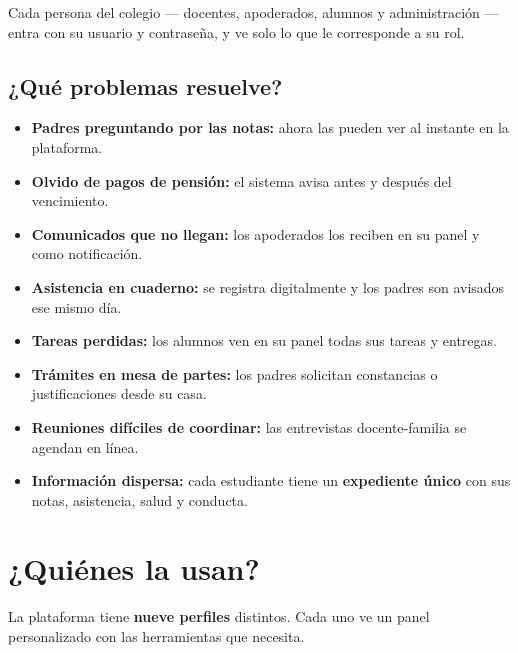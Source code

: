 \documentclass[11pt,a4paper]{article}
\begin{document}
Cada persona del colegio --- docentes, apoderados, alumnos y administración --- entra con su usuario y contraseña, y ve solo lo que le corresponde a su rol.

\subsection*{¿Qué problemas resuelve?}

\begin{itemize}
\item \textbf{Padres preguntando por las notas:} ahora las pueden ver al instante en la plataforma.
\item \textbf{Olvido de pagos de pensión:} el sistema avisa antes y después del vencimiento.
\item \textbf{Comunicados que no llegan:} los apoderados los reciben en su panel y como notificación.
\item \textbf{Asistencia en cuaderno:} se registra digitalmente y los padres son avisados ese mismo día.
\item \textbf{Tareas perdidas:} los alumnos ven en su panel todas sus tareas y entregas.
\item \textbf{Trámites en mesa de partes:} los padres solicitan constancias o justificaciones desde su casa.
\item \textbf{Reuniones difíciles de coordinar:} las entrevistas docente-familia se agendan en línea.
\item \textbf{Información dispersa:} cada estudiante tiene un \textbf{expediente único} con sus notas, asistencia, salud y conducta.
\end{itemize}

\section{¿Quiénes la usan?}

La plataforma tiene \textbf{nueve perfiles} distintos. Cada uno ve un panel personalizado con las herramientas que necesita.
\end{document}
